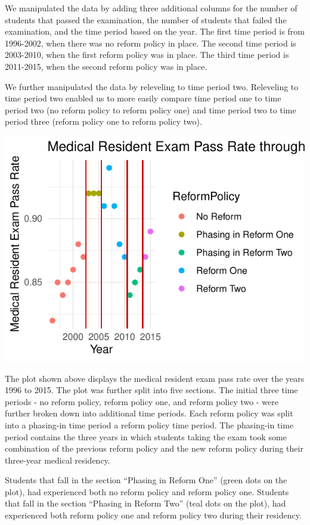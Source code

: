 \documentclass[
  letterpaper,
  DIV=11,
  numbers=noendperiod]{scrartcl}
\begin{document}
We manipulated the data by adding three additional columns for the
number of students that passed the examination, the number of students
that failed the examination, and the time period based on the year. The
first time period is from 1996-2002, when there was no reform policy in
place. The second time period is 2003-2010, when the first reform policy
was in place. The third time period is 2011-2015, when the second reform
policy was in place.

We further manipulated the data by releveling to time period two.
Releveling to time period two enabled us to more easily compare time
period one to time period two (no reform policy to reform policy one)
and time period two to time period three (reform policy one to reform
policy two).

\includegraphics{Report_files/figure-pdf/unnamed-chunk-6-1.pdf}

The plot shown above displays the medical resident exam pass rate over
the years 1996 to 2015. The plot was further split into five sections.
The initial three time periods - no reform policy, reform policy one,
and reform policy two - were further broken down into additional time
periods. Each reform policy was split into a phasing-in time period a
reform policy time period. The phasing-in time period contains the three
years in which students taking the exam took some combination of the
previous reform policy and the new reform policy during their three-year
medical residency.

Students that fall in the section ``Phasing in Reform One'' (green dots
on the plot), had experienced both no reform policy and reform policy
one. Students that fall in the section ``Phasing in Reform Two'' (teal
dots on the plot), had experienced both reform policy one and reform
policy two during their residency.
\end{document}
